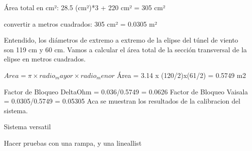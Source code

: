 Área total en cm²: 28.5 (cm²)*3 + 220 cm² =  305 cm²

convertir a metros cuadrados:
305 cm² = 0.0305 m²


Entendido, los diámetros de extremo a extremo de la elipse del túnel de viento son 119 cm y 60 cm. Vamos a calcular el área total de la sección transversal de la elipse en metros cuadrados.

$Area=\pi × radio_mayor × radio_ menor$
Área = 3.14 x (120/2)x(61/2) = 0.5749 m2

Factor de Bloqueo DeltaOhm = 0.036/0.5749 = 0.0626
Factor de Bloqueo Vaisala = 0.0305/0.5749 = 0.05305
Aca se muestran los resultados de la calibracion del sistema.

Sistema versatil

Hacer pruebas con una rampa, y una lineallist